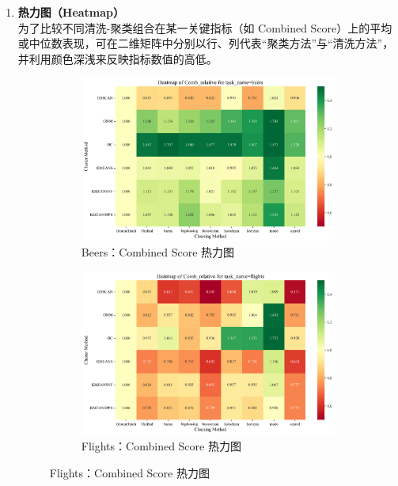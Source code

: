 \documentclass[10pt]{article} %
\numberwithin{equation}{section}
\begin{document}
\begin{enumerate}[label=(\alph*)]
    \item \textbf{热力图（Heatmap）} \\
    为了比较不同清洗-聚类组合在某一关键指标（如 Combined Score）上的平均或中位数表现，可在二维矩阵中分别以行、列代表“聚类方法”与“清洗方法”，并利用颜色深浅来反映指标数值的高低。
\begin{figure}[htbp]
    \centering
    \begin{subfigure}[b]{0.45\linewidth}
        \centering
        \includegraphics[width=\linewidth]{figures/heatmap/heatmap_beers_Comb_relative.png}
        \caption{Beers：Combined Score 热力图}
        \label{fig:heatmap_beers}
    \end{subfigure}
    \hfill
    \begin{subfigure}[b]{0.45\linewidth}
        \centering
        \includegraphics[width=\linewidth]{figures/heatmap/heatmap_flights_Comb_relative.png}
        \caption{Flights：Combined Score 热力图}
        \label{fig:heatmap_flights}
    \end{subfigure}


\end{figure}
\end{enumerate}
\end{document}
